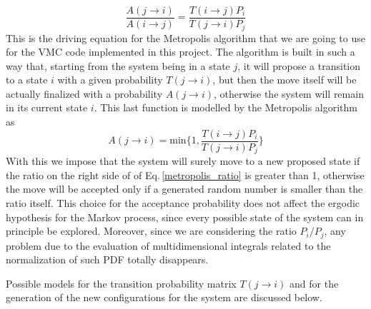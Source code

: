 \begin{equation}
    \frac{A(j\rightarrow i)}{A(i\rightarrow j)} =  \frac{ T(i\rightarrow j) P_i}{T(j\rightarrow i) P_j}
    \label{metropolis_ratio}
\end{equation}
This is the driving equation for the Metropolis algorithm that we are going to use for the VMC code implemented in this project. The algorithm is built in such a way that, starting from the system being in a state $j$, it will propose a transition to a state $i$ with a given probability $T(j\rightarrow i)$, but then the move itself will be actually finalized with a probability $A(j\rightarrow i)$, otherwise the system will remain in its current state $i$. This last function is modelled by the Metropolis algorithm as
\begin{equation}
    A(j\rightarrow i ) = \text{min} \bigg\{ 1, \frac{T(i \rightarrow j) P_i}{T(j\rightarrow i) P_j} \bigg\}
    \label{acceptance_ratio}
\end{equation}
With this we impose that the system will surely move to a new proposed state if the ratio on the right side of of Eq.\,\ref{metropolis_ratio} is greater than 1, otherwise the move will be accepted only if a generated random number is smaller than the ratio itself. This choice for the acceptance probability does not affect the ergodic hypothesis for the Markov process, since every possible state of the system can in principle be explored. Moreover, since we are considering the ratio $P_i/P_j$, any problem due to the evaluation of multidimensional integrals related to the normalization of such PDF totally disappears. 

Possible models for the transition probability matrix $T(j\rightarrow i)$ and for the generation of the new configurations for the system are discussed below.

